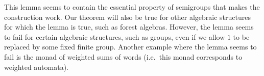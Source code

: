 This lemma seems to contain the essential property of semigroups that makes the construction work. Our theorem will also be true for other algebraic structures for which the lemma is true, such as forest algebras. However, the lemma seems to fail for certain algebraic structures, such as groups, even if we allow $1$ to be replaced by some fixed finite group. Another example where the lemma seems to fail is the monad of weighted sums of words (i.e.~this monad corresponds to weighted automata).

